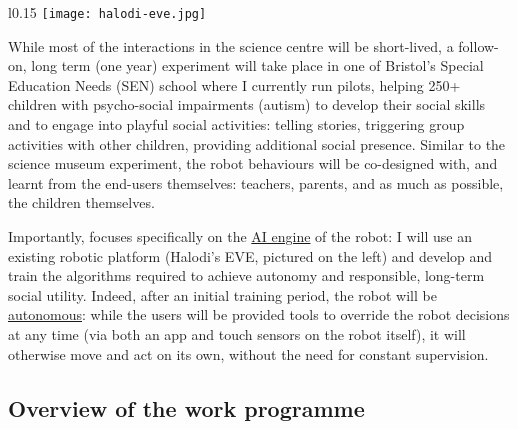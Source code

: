 \begin{wrapfigure}[11]{l}{0.15\linewidth}
    \centering
    \vspace{-10pt}
    \texttt{[image: halodi-eve.jpg]}
    \label{fig|EVE}
\end{wrapfigure}

While most of the interactions in the science centre will be short-lived, a
follow-on, long term (one year) experiment will take place in one of Bristol's
Special Education Needs (SEN) school where I currently run pilots, helping 250+
children with psycho-social impairments (autism) to develop their social skills
and to engage into playful social activities: telling stories, triggering group
activities with other children, providing additional social presence. Similar to
the science museum experiment, the robot behaviours will be co-designed with,
and learnt from the end-users themselves: teachers, parents, and as much as possible,
the children themselves.


Importantly, \project focuses specifically on the \ul{AI engine} of the robot: I
will use an existing robotic platform (Halodi's EVE, pictured on the left) and
develop and train the algorithms required to achieve autonomy and responsible,
long-term social utility. Indeed, after an initial training period, the robot
will be \ul{autonomous}: while the users will be provided tools to override
the robot decisions at any time (via both an app and touch sensors on the robot
itself), it will otherwise move and act on its own, without the need for
constant supervision.



\subsection{Overview of the work programme}

